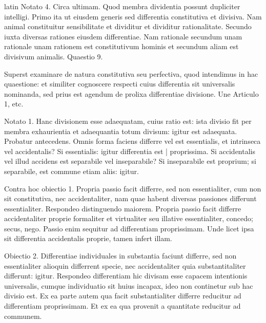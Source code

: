 \begin{otherlanguage*}{latin}
\pstart
 Notato 4. Circa ultimam. Quod membra dividentia possunt dupliciter intelligi. Primo ita ut eiusdem generis sed differentia constitutiva et divisiva. Nam animal constituitur sensibilitate et dividitur et dividitur rationalitate. Secundo iuxta diversas rationes eiusdem differentiae. Nam rationale secundum unam rationale unam rationem est constitutivum hominis et secundum aliam est divisivum animalis. Quaestio 9. 
\pend

        \pstart
        \pend
      
\pstart
 Superst examinare de natura constitutiva seu perfectiva, quod intendimus in hac quaestione: et similiter cognoscere respecti cuius differentia sit universalis nominanda, sed prius est agendum de prolixa differentiae divisione. Une Articulo 1, etc. 
\pend

        \pstart
        \pend
      
\pstart
 Notato 1. Hanc divisionem esse adaequatam, cuius ratio est: ista divisio fit per membra exhaurientia et adaequantia totum divisum: igitur est adaequata. Probatur antecedens. Omnis forma faciens differre vel est essentialis, et intrinseca vel accidentalis? Si essentialis: igitur differentia est \textnormal{|}   proprissima. Si accidentalis vel illud accidens est separabile vel inseparabile? Si inseparabile est proprium; si separabile, est commune etiam aliis: igitur. 
\pend

\pstart
 Contra hoc obiectio 1. Propria passio facit differre, sed non essentialiter, cum non sit constitutiva, nec accidentaliter, nam quae habent diversas passiones differunt essentialiter. Respondeo distinguendo maiorem. Propria passio facit differre accidentaliter proprie formaliter et virtualiter seu illative essentialiter, concedo; secus, nego. Passio enim sequitur ad differentiam proprissimam. Unde licet ipsa sit differentia accidentalis proprie, tamen infert illam. 
\pend

\pstart
 Obiectio 2. Differentiae individuales in substantia faciunt differre, sed non essentialiter alioquin differrent specie, nec accidentaliter quia substantitaliter differunt: igitur. Respondeo differentiam hic divisam esse capacem intentionis universalis, cumque individuatio sit huius incapax, ideo non continetur sub hac divisio est. Ex ea parte autem qua facit substantialiter differre reducitur ad differentiam proprissimam. Et ex ea qua provenit a quantitate reducitur ad communem. 
\pend


\end{otherlanguage*}
